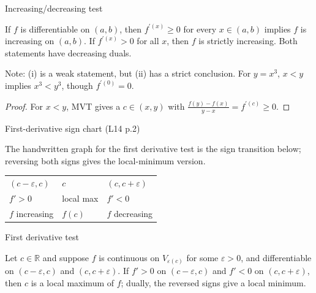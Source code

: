 \begin{corollary}{Increasing/decreasing test}

If \(f\) is differentiable on \(\left( {a,b} \right)\), then \(f^{'{(x)}} \geq 0\) for every \(x \in \left( {a,b} \right)\) implies \(f\) is increasing on \(\left( {a,b} \right)\). If \(f^{'{(x)}} > 0\) for all \(x\), then \(f\) is strictly increasing. Both statements have decreasing duals.

Note: (i) is a weak statement, but (ii) has a strict conclusion. For \(y = x^{3}\), \(x < y\) implies \(x^{3} < y^{3}\), though \(f^{'{(0)}} = 0\).

\end{corollary}

\begin{proof}

For \(x < y\), MVT gives a \(c \in \left( {x,y} \right)\) with \(\frac{f(y) - f(x)}{y - x} = f^{'{(c)}} \geq 0\).

\end{proof}

\begin{qlremark}{First-derivative sign chart (L14 p.2)}

The handwritten graph for the first derivative test is the sign transition below; reversing both signs gives the local-minimum version.

{\def\LTcaptype{none} %
\begin{longtable}[]{@{}lll@{}}
\toprule\noalign{}
\endhead
\bottomrule\noalign{}
\endlastfoot
\(\left( {c - \varepsilon,c} \right)\) & \(c\) & \(\left( {c,c + \varepsilon} \right)\) \\
\(f' > 0\) & local max & \(f' < 0\) \\
\(f\) increasing & \(f(c)\) & \(f\) decreasing \\
\end{longtable}
}

\end{qlremark}

\begin{corollary}{First derivative test}

Let \(c \in \mathbb{R}\) and suppose \(f\) is continuous on \(V_{\varepsilon{(c)}}\) for some \(\varepsilon > 0\), and differentiable on \(\left( {c - \varepsilon,c} \right)\) and \(\left( {c,c + \varepsilon} \right)\). If \(f' > 0\) on \(\left( {c - \varepsilon,c} \right)\) and \(f' < 0\) on \(\left( {c,c + \varepsilon} \right)\), then \(c\) is a local maximum of \(f\); dually, the reversed signs give a local minimum.

\end{corollary}

